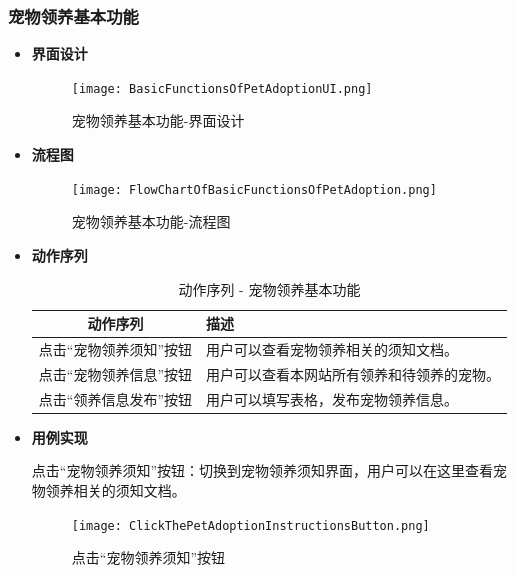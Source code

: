 \subsubsection{宠物领养基本功能}

\begin{itemize}
	\item[] \textbf{界面设计}
	
	\begin{figure}[H]
		\centering
		\texttt{[image: BasicFunctionsOfPetAdoptionUI.png]} 
		\caption{宠物领养基本功能-界面设计}
		\label{fig:Basic functions of pet adoption UI}
	\end{figure}
	
	\item[] \textbf{流程图}
	
	\begin{figure}[H]
		\centering
		\texttt{[image: FlowChartOfBasicFunctionsOfPetAdoption.png]} 
		\caption{宠物领养基本功能-流程图}
		\label{fig:Flow chart of basic functions of pet adoption}
	\end{figure}
	
	\item[] \textbf{动作序列}
	
	\begin{table}[H]
		\centering
		\caption{动作序列 - 宠物领养基本功能}
		\renewcommand\arraystretch{1.5}
		\begin{tabular}{|c|>{\raggedright\arraybackslash}p{7cm}|}
			\hline
			\textbf{动作序列} & \textbf{描述} \\ \hline
			点击“宠物领养须知”按钮 & 用户可以查看宠物领养相关的须知文档。 \\ \hline
			点击“宠物领养信息”按钮 & 用户可以查看本网站所有领养和待领养的宠物。 \\ \hline
			点击“领养信息发布”按钮 & 用户可以填写表格，发布宠物领养信息。 \\ \hline
		\end{tabular}
		\label{table:adoption-basic-sequence}
	\end{table}
	
	\item[] \textbf{用例实现}
	
	点击“宠物领养须知”按钮：切换到宠物领养须知界面，用户可以在这里查看宠物领养相关的须知文档。
	
	\begin{figure}[H]
		\centering
		\texttt{[image: ClickThePetAdoptionInstructionsButton.png]} 
		\caption{点击“宠物领养须知”按钮}
		\label{fig:Click the Pet Adoption Instructions button}
	\end{figure}
	

\end{itemize}
